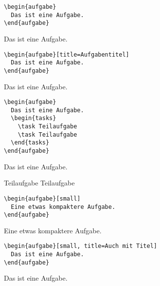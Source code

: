 \documentclass[]{arbeitsblatt}
\begin{document}
\begin{verbatim}
\begin{aufgabe}
  Das ist eine Aufgabe.
\end{aufgabe}
\end{verbatim}

\begin{aufgabe}
  Das ist eine Aufgabe.
\end{aufgabe}

\vfill

\begin{verbatim}
\begin{aufgabe}[title=Aufgabentitel]
  Das ist eine Aufgabe.
\end{aufgabe}
\end{verbatim}

\begin{aufgabe}[title=Aufgabentitel]
  Das ist eine Aufgabe.
\end{aufgabe}

\vfill

\begin{verbatim}
\begin{aufgabe}
  Das ist eine Aufgabe.
  \begin{tasks}
    \task Teilaufgabe
    \task Teilaufgabe
  \end{tasks}
\end{aufgabe}
\end{verbatim}

\begin{aufgabe}
  Das ist eine Aufgabe.
  \begin{tasks}
    \task Teilaufgabe
    \task Teilaufgabe
  \end{tasks}
\end{aufgabe}

\vfill

\begin{verbatim}
\begin{aufgabe}[small]
  Eine etwas kompaktere Aufgabe.
\end{aufgabe}
\end{verbatim}

\begin{aufgabe}[small]
  Eine etwas kompaktere Aufgabe.
\end{aufgabe}

\vfill

\begin{verbatim}
\begin{aufgabe}[small, title=Auch mit Titel]
  Das ist eine Aufgabe.
\end{aufgabe}
\end{verbatim}

\begin{aufgabe}[small, title=Auch mit Titel]
  Das ist eine Aufgabe.
\end{aufgabe}
\end{document}
